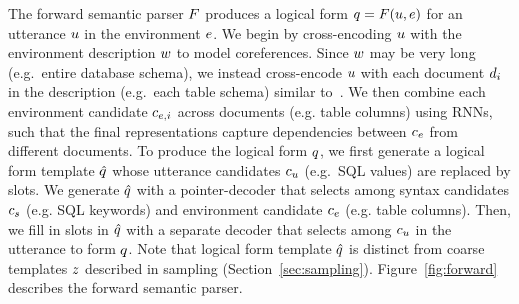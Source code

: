 \documentclass[11pt,a4paper]{article}
\begin{document}
The forward semantic parser ${F}$ produces a logical form ${q} = {F}({u}, {e})$ for an utterance ${u}$ in the environment ${e}$.
We begin by cross-encoding ${u}$ with the environment description ${w}$ to model coreferences.
Since ${w}$ may be very long (e.g.~entire database schema), we instead cross-encode ${u}$ with each document ${d}_i$ in the description (e.g.~each table schema) similar to~\citet{zhang2019editing}.
We then combine each environment candidate ${c}_{{e}, i}$ across documents (e.g. table columns) using RNNs, such that the final representations capture dependencies between ${c}_{e}$ from different documents.
To produce the logical form ${q}$, we first generate a logical form template ${\hat{{q}}}$ whose utterance candidates ${c}_{u}$ (e.g.~SQL values) are replaced by slots.
We generate ${\hat{{q}}}$ with a pointer-decoder that selects among syntax candidates ${c}_{s}$ (e.g. SQL keywords) and environment candidate ${c}_{e}$ (e.g. table columns).
Then, we fill in slots in ${\hat{{q}}}$ with a separate decoder that selects among ${c}_{u}$ in the utterance to form ${q}$.
Note that logical form template ${\hat{{q}}}$ is distinct from coarse templates ${z}$ described in sampling (Section~\ref{sec:sampling}).
Figure~\ref{fig:forward} describes the forward semantic parser.
\end{document}
